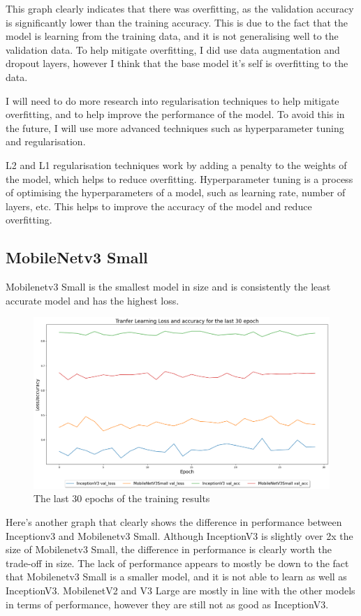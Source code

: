 \documentclass[]{final_report}
\begin{document}
This graph clearly indicates that there was overfitting, as the validation accuracy is significantly lower than the training accuracy.
This is due to the fact that the model is learning from the training data, and it is not generalising well to the validation data.
To help mitigate overfitting, I did use data augmentation and dropout layers, however I think that the base model it's self is overfitting to the data.

I will need to do more research into regularisation techniques to help mitigate overfitting, and to help improve the performance of the model.
To avoid this in the future, I will use more advanced techniques such as hyperparameter tuning and regularisation.

L2 and L1 regularisation techniques work by adding a penalty to the weights of the model, which helps to reduce overfitting.
Hyperparameter tuning is a process of optimising the hyperparameters of a model, such as learning rate, number of layers, etc. 
This helps to improve the accuracy of the model and reduce overfitting.
\pagebreak

\subsection{MobileNetv3 Small}

Mobilenetv3 Small is the smallest model in size and is consistently the least accurate model and has the highest loss.

\begin{figure}[ht!]
  \centering
  \includegraphics[width=120mm]{images/mobilenet-v3-small-vs-inception-v3.png}
  \caption{The last 30 epochs of the training results}
\end{figure}

Here's another graph that clearly shows the difference in performance between Inceptionv3 and Mobilenetv3 Small.
Although InceptionV3 is slightly over 2x the size of Mobilenetv3 Small, the difference in performance is clearly worth the trade-off in size.
The lack of performance appears to mostly be down to the fact that Mobilenetv3 Small is a smaller model, and it is not able to learn as well as InceptionV3.
MobilenetV2 and V3 Large are mostly in line with the other models in terms of performance, however they are still not as good as InceptionV3.
\end{document}
